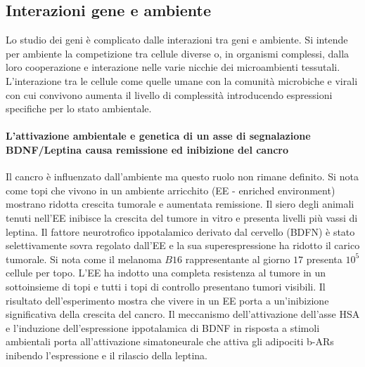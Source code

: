 \subsection{Interazioni gene e ambiente}
Lo studio dei geni \`e complicato dalle interazioni tra geni e ambiente. Si intende per ambiente la competizione tra cellule diverse o, in organismi complessi, dalla loro cooperazione
e interazione nelle varie nicchie dei microambienti tessutali. L'interazione tra le cellule come quelle umane con la comunit\`a microbiche e virali con cui convivono aumenta il livello
di complessit\`a introducendo espressioni specifiche per lo stato ambientale. 
\paragraph{L'attivazione ambientale e genetica di un asse di segnalazione BDNF/Leptina causa remissione ed inibizione del cancro}
Il cancro \`e influenzato dall'ambiente ma questo ruolo non rimane definito. Si nota come topi che vivono in un ambiente arricchito (EE - enriched environment) mostrano ridotta crescita
tumorale e aumentata remissione. Il siero degli animali tenuti nell'EE inibisce la crescita del tumore in vitro e presenta livelli pi\`u vassi di leptina. Il fattore neurotrofico 
ippotalamico derivato dal cervello (BDFN) \`e stato selettivamente sovra regolato dall'EE e la sua superespressione ha ridotto il carico tumorale. Si nota come il melanoma 
$B16$ rappresentante al giorno $17$ presenta $10^5$ cellule per topo. L'EE ha indotto una completa resistenza al tumore in un sottoinsieme di topi e tutti i topi di controllo
presentano tumori visibili. Il risultato dell'esperimento mostra che vivere in un EE porta a un'inibizione significativa della crescita del cancro. Il meccanismo dell'attivazione
dell'asse HSA e l'induzione dell'espressione ippotalamica di BDNF in risposta a stimoli ambientali porta all'attivazione simatoneurale che attiva gli adipociti b-ARs inibendo 
l'espressione e il rilascio della leptina.

